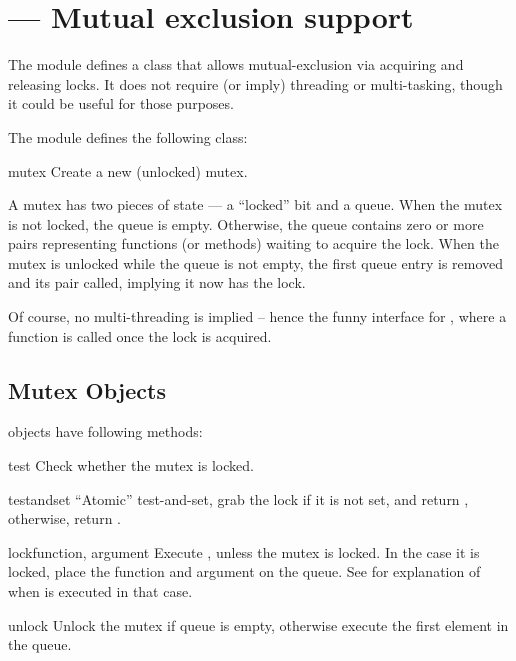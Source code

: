 \section{ ---
         Mutual exclusion support}


The  module defines a class that allows mutual-exclusion
via acquiring and releasing locks. It does not require (or imply)
threading or multi-tasking, though it could be useful for
those purposes.

The  module defines the following class:

\begin{classdesc}{mutex}{}
Create a new (unlocked) mutex.

A mutex has two pieces of state --- a ``locked'' bit and a queue.
When the mutex is not locked, the queue is empty.
Otherwise, the queue contains zero or more 
 pairs
representing functions (or methods) waiting to acquire the lock.
When the mutex is unlocked while the queue is not empty,
the first queue entry is removed and its 
 pair called,
implying it now has the lock.

Of course, no multi-threading is implied -- hence the funny interface
for , where a function is called once the lock is
acquired.
\end{classdesc}


\subsection{Mutex Objects \label{mutex-objects}}

 objects have following methods:

\begin{methoddesc}[mutex]{test}{}
Check whether the mutex is locked.
\end{methoddesc}

\begin{methoddesc}[mutex]{testandset}{}
``Atomic'' test-and-set, grab the lock if it is not set,
and return , otherwise, return .
\end{methoddesc}

\begin{methoddesc}[mutex]{lock}{function, argument}
Execute , unless the mutex is locked.
In the case it is locked, place the function and argument on the queue.
See  for explanation of when
 is executed in that case.
\end{methoddesc}

\begin{methoddesc}[mutex]{unlock}{}
Unlock the mutex if queue is empty, otherwise execute the first element
in the queue.
\end{methoddesc}

